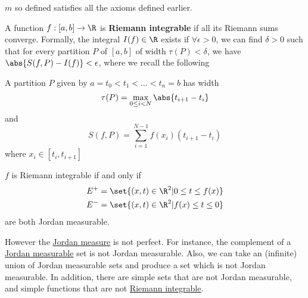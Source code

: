 \documentclass{article}
\newcommand{\1}[1]{\mathbbm{1}_{#1}}
\begin{document}

\begin{exercise}
    $m$ so defined satisfies all the axioms defined earlier.
\end{exercise}

\begin{defi}
    A function $f:[a, b] \to \R$ is \textbf{Riemann integrable} if all its Riemann sums converge.
    Formally, the integral $I(f) \in \R$ exists if $\forall \epsilon > 0$, we can find $\delta > 0$ such that for every partition $P$ of $[a, b]$ of width $\tau(P) < \delta$, we have $\abs{S(f, P) - I(f)} < \epsilon$, where we recall the following

    A partition $P$ given by $a = t_0 < t_1 < \dots < t_n = b$ has width
    \begin{equation*}
        \tau(P) = \max_{0 \leq i < N} \abs{t_{i+1} - t_i}
    \end{equation*}
    and
    \begin{equation*}
        S(f, P) = \sum_{i=1}^{N-1} f(x_i) (t_{i+1} - t_i)
    \end{equation*}
    where $x_i \in [t_i, t_{i+1}]$
\end{defi}

\begin{prop}
    $f$ is Riemann integrable if and only if
    \begin{align*}
        E^+ &= \set{(x, t) \in \R^2 | 0 \leq t \leq f(x)} \\
        E^- &= \set{(x, t) \in \R^2 | f(x) \leq t \leq 0}
    \end{align*}
    are both Jordan measurable.
\end{prop}

However the \hyperlink{def:jMeasure}{Jordan measure} is not perfect. For instance, the complement of a \hyperlink{def:jMeasurable}{Jordan measurable} set is not Jordan measurable.
Also, we can take an (infinite) union of Jordan measurable sets and produce a set which is not Jordan measurable.
In addition, there are simple sets that are not Jordan measurable, and simple functions that are not \hyperlink{def:riemannIntegrable}{Riemann integrable}.
\end{document}
